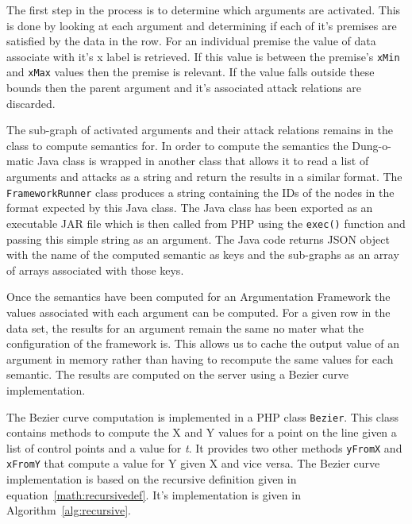 The first step in the process is to determine which arguments are activated. This is done by looking at each argument and determining if each of it's premises are satisfied by the data in the row. For an individual premise the value of data associate with it's x label is retrieved. If this value is between the premise's \lstinline{xMin} and \lstinline{xMax} values then the premise is relevant. If the value falls outside these bounds then the parent argument and it's associated attack relations are discarded. 

The sub-graph of activated arguments and their attack relations remains in the class to compute semantics for. In order to compute the semantics the Dung-o-matic Java class is wrapped in another class that allows it to read a list of arguments and attacks as a string and return the results in a similar format. The \lstinline{FrameworkRunner} class produces a string containing the IDs of the nodes in the format expected by this Java class. The Java class has been exported as an executable JAR file which is then called from PHP using the \lstinline{exec()} function and passing this simple string as an argument. The Java code returns JSON object with the name of the computed semantic as keys and the sub-graphs as an array of arrays associated with those keys.

Once the semantics have been computed for an Argumentation Framework the values associated with each argument can be computed. For a given row in the data set, the results for an argument remain the same no mater what the configuration of the framework is. This allows us to cache the output value of an argument in memory rather than having to recompute the same values for each semantic. The results are computed on the server using a Bezier curve implementation. 

The Bezier curve computation is implemented in a PHP class \lstinline{Bezier}. This class contains methods to compute the X and Y values for a point on the line given a list of control points and a value for \textit{t}. It provides two other methods \lstinline{yFromX} and \lstinline{xFromY} that compute a value for Y given X and vice versa. The Bezier curve implementation is based on the recursive definition given in equation~\ref{math:recursivedef}. It's implementation is given in Algorithm~\ref{alg:recursive}.

